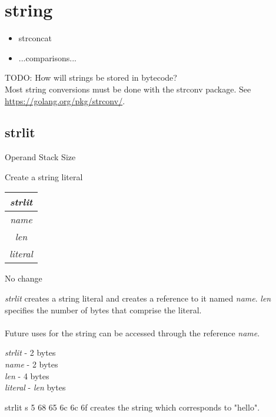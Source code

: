\documentclass[12pt]{article}
\begin{document}
	\section{string}
		\begin{itemize}
			\item strconcat
			\item ...comparisons...
		\end{itemize}
		TODO: How will strings be stored in bytecode? \\
		Most string conversions must be done with the \colorbox{code}{strconv} package. See \url{https://golang.org/pkg/strconv/}.
		\newpage 
		
		\subsection*{strlit}
			\begin{labeling}{Operand Stack Size}
				\item [\textbf{Operation}] Create a string literal
				\item [\textbf{Format}] \begin{tabular}{| c |} \hline \textit{strlit} \\ \hline \textit{name} \\ \hline \textit{len} \\ \hline \textit{literal} \\ \hline \end{tabular}
				\item [\textbf{Operand Stack}] No change
				\item [\textbf{Description}] \textit{strlit} creates a string literal and creates a reference to it named \textit{name}. \textit{len} specifies the number of bytes that comprise the literal. \\ \\
				Future uses for the string can be accessed through the reference \textit{name}.			
				\item [\textbf{Instruction Size}]\textit{strlit} - 2 bytes \\
					\textit{name} - 2 bytes \\
					\textit{len} - 4 bytes \\
					\textit{literal} - \textit{len} bytes  
				\item [\textbf{Example}]\colorbox{code}{strlit s 5 68 65 6c 6c 6f} creates the string which corresponds to "hello". 
			\end{labeling}	
		\newpage
		
\end{document}
